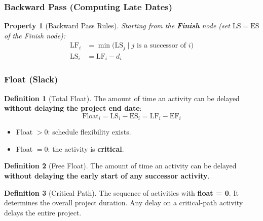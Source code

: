 \documentclass[11pt,a4paper]{article}
\theoremstyle{definition}
\newtheorem{definition}{Definition}[section]
\theoremstyle{plain}
\newtheorem{property}{Property}[section]
\begin{document}
\subsubsection{Backward Pass (Computing Late Dates)}

\begin{property}[Backward Pass Rules]
Starting from the \textbf{Finish} node (set $\mathrm{LS} = \mathrm{ES}$ of the Finish node):
\begin{align}
  \mathrm{LF}_i &= \min\bigl(\mathrm{LS}_j \;\big|\; j \text{ is a successor of } i\bigr) \\
  \mathrm{LS}_i &= \mathrm{LF}_i - d_i
\end{align}
\end{property}

\subsubsection{Float (Slack)}

\begin{definition}[Total Float]
The amount of time an activity can be delayed \textbf{without delaying the project end date}:
\[
  \text{Float}_i = \mathrm{LS}_i - \mathrm{ES}_i = \mathrm{LF}_i - \mathrm{EF}_i
\]
\begin{itemize}[nosep]
  \item Float $> 0$: schedule flexibility exists.
  \item Float $= 0$: the activity is \textbf{critical}.
\end{itemize}
\end{definition}

\begin{definition}[Free Float]
The amount of time an activity can be delayed \textbf{without delaying the early start of any successor activity}.
\end{definition}

\begin{definition}[Critical Path]
The sequence of activities with \textbf{float = 0}. It determines the overall project duration. Any delay on a critical-path activity delays the entire project.
\end{definition}
\end{document}
